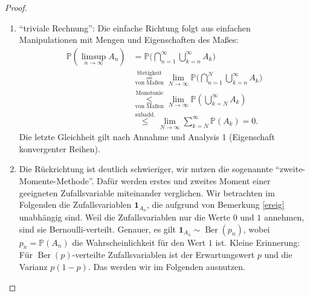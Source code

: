 \begin{proof}\abs
	\begin{enumerate}[label=(\roman*)]
		\item \enquote{triviale Rechnung}: Die einfache Richtung folgt aus einfachen Manipulationen mit Mengen und Eigenschaften des Ma\ss es:
		\begin{align*}
			\mathbb{P}(\limsup\limits_{n \to \infty} A_n) 
			&= \mathbb{P}\Big(\bigcap_{n=1}^{\infty} \bigcup_{k=n}^{\infty} A_k\Big)\\
			&\overset{\text{Stetigkeit}}{\underset{\text{von Maßen}}{=}}\lim\limits_{N \to \infty} \mathbb{P}\Big(\bigcap_{n=1}^{N} \bigcup_{k=n}^{\infty} A_k\Big)\\
			&\overset{\text{Monotonie}}{\underset{\text{von Maßen}}{\leq}}\lim\limits_{N \to \infty} \mathbb{P}(\bigcup_{k=N}^{\infty} A_k) \\
			&\overset{\text{subadd.}}{\leq} \lim\limits_{N \to \infty} \sum\limits_{k=N}^{\infty} \mathbb{P}(A_k) = 0.
		\end{align*}
		Die letzte Gleichheit gilt nach Annahme und Analysis 1 (Eigenschaft konvergenter Reihen).
		\item Die R\"uckrichtung ist deutlich schwieriger, wir nutzen die sogenannte \enquote{zweite-Momente-Methode}. Daf\"ur werden erstes und zweites Moment einer geeigneten Zufallsvariable miteinander verglichen. Wir betrachten im Folgenden die Zufallsvariablen $\mathbf 1_{A_n}$, die aufgrund von Bemerkung \ref{ereig} unabh\"angig sind. Weil die Zufallsvariablen nur die Werte $0$ und $1$ annehmen, sind sie Bernoulli-verteilt. Genauer, es gilt $\mathbf 1_{A_n}\sim \operatorname{Ber}(p_n)$, wobei $p_n=\mathbb P(A_n)$ die Wahrscheinlichkeit f\"ur den Wert $1$ ist. Kleine Erinnerung: F\"ur $\operatorname{Ber}(p)$-verteilte Zufallsvariablen ist der Erwartungswert $p$ und die Varianz $p(1-p)$. Das werden wir im Folgenden ausnutzen.\smallskip
		

\end{enumerate}
\end{proof}
